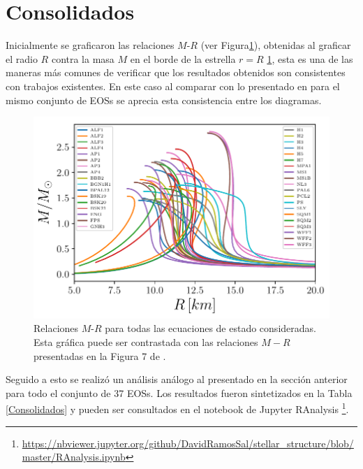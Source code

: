 \section{Consolidados}
\noindent Inicialmente se graficaron las relaciones $M$-$R$ (ver Figura\ref{MRrel}), obtenidas al graficar el radio $R$ contra la masa $M$ en el borde de la estrella $r=R$ \ref{MRrel}, esta es una de las maneras más comunes de verificar que los resultados obtenidos son consistentes con trabajos existentes. En este caso al comparar con lo presentado en \cite{Ozel2016} para el mismo conjunto de EOSs se aprecia esta consistencia entre los diagramas.

\begin{figure}[H]
    \centering
    \includegraphics[width=0.8\linewidth]{figures/MRrels.pdf}
    \caption[Relaciones $M-R$]{Relaciones $M$-$R$ para todas las ecuaciones de estado consideradas. Esta gráfica puede ser contrastada con las relaciones $M-R$ presentadas en la Figura 7 de \cite{Ozel2016}.} 
    \label{MRrel}
\end{figure}

Seguido a esto se realizó un análisis análogo al presentado en la sección anterior para todo el conjunto de 37 EOSs. Los resultados fueron sintetizados en la Tabla \ref{Consolidados} y pueden ser consultados en el notebook de Jupyter RAnalysis \footnote{\url{https://nbviewer.jupyter.org/github/DavidRamosSal/stellar_structure/blob/master/RAnalysis.ipynb}}. 

